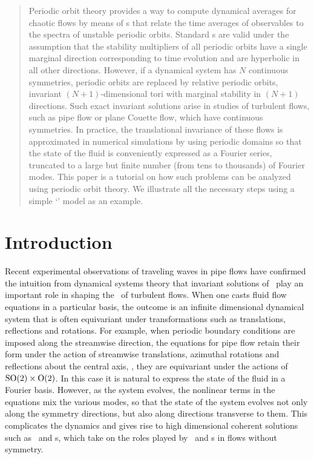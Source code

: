 \documentclass[aip,cha,
reprint,
secnumarabic,
nofootinbib, tightenlines,
nobibnotes, showkeys, showpacs,
superscriptaddress,
]{revtex4-1}
\begin{document}
\begin{quotation}
Periodic orbit theory provides a way to compute dynamical averages for
chaotic flows by means of {\cycForm s} that relate the time averages of
observables to the spectra of unstable periodic orbits. Standard
{\cycForm s} are valid under the assumption that the stability
multipliers of all periodic orbits have a single marginal direction
corresponding to time evolution and are hyperbolic in all other
directions. However, if a dynamical system has $N$ continuous symmetries,
periodic orbits are replaced by relative periodic orbits, invariant
$(N+1)$-dimensional tori with marginal stability in $(N+1)$ directions.
Such exact invariant solutions arise in studies of turbulent flows, such
as pipe flow or plane Couette flow, which have continuous symmetries.
In practice, the translational invariance of these flows is approximated in numerical
simulations by using periodic domains so that the state of the fluid
is conveniently expressed as a Fourier series, truncated to a large but finite
number (from tens to thousands) of Fourier modes. This paper is a tutorial on
how such problems can be analyzed using periodic orbit theory. We illustrate
all the necessary steps using a simple `\twomode' model as an example.
\end{quotation}

\section{Introduction}
\label{s:intro}

Recent experimental observations of traveling waves in pipe flows have
confirmed the intuition from dynamical systems theory that invariant solutions
of \NSe\ play an important role in shaping the \statesp\ of turbulent
flows. When one casts fluid flow equations in a
particular basis, the outcome is an infinite dimensional dynamical system
that is often equivariant under transformations such as
translations, reflections and rotations. For example, when periodic
boundary conditions are imposed along the streamwise direction, the equations
for pipe flow retain their form under the action of streamwise translations,
azimuthal rotations and reflections about the central axis, \ie, they are equivariant
under the actions of $\textrm{SO}(2)\times\textrm{O}(2)$. In this case it is natural
to express the state of the fluid in a Fourier basis. However,
as the system evolves, the nonlinear terms in the equations mix the
various modes, so that the state of the system evolves not only along the
symmetry directions, but also along directions transverse to them.
This complicates the dynamics and gives rise to high dimensional coherent
solutions such as \reqva\ and \rpo s, which take on the roles played by
\eqva\ and \po s in flows without symmetry.
\end{document}
